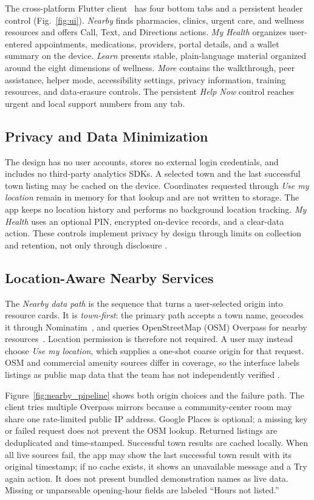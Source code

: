 \documentclass[conference,a4paper]{IEEEtran}
\begin{document}
The cross-platform Flutter client~\cite{FlutterDocs2026} has four bottom tabs
and a persistent header control (Fig.~\ref{fig:ui}). \emph{Nearby} finds
pharmacies, clinics, urgent care, and wellness resources and offers Call, Text,
and Directions actions. \emph{My Health} organizes user-entered appointments,
medications, providers, portal details, and a wallet summary on the device.
\emph{Learn} presents stable, plain-language material organized around the eight
dimensions of wellness. \emph{More} contains the walkthrough, peer assistance,
helper mode, accessibility settings, privacy information, training resources,
and data-erasure controls. The persistent \emph{Help Now} control reaches urgent
and local support numbers from any tab.

\subsection{Privacy and Data Minimization}
The design has no user accounts, stores no external login credentials, and
includes no third-party analytics SDKs. A selected town and the last successful
town listing may be cached on the device. Coordinates requested through
\emph{Use my location} remain in memory for that lookup and are not written to
storage. The app keeps no location history and performs no background location
tracking. \emph{My Health} uses an optional PIN, encrypted on-device records,
and a clear-data action. These controls implement privacy by design through
limits on collection and retention, not only through disclosure
\cite{Cavoukian2010PbDWorkshop}.

\subsection{Location-Aware Nearby Services}
The \emph{Nearby data path} is the sequence that turns a user-selected origin
into resource cards. It is \emph{town-first}: the primary path accepts a town
name, geocodes it through Nominatim~\cite{NominatimDocs}, and queries
OpenStreetMap (OSM) Overpass for nearby resources~\cite{OverpassDocs}. Location
permission is therefore not required. A user may instead choose \emph{Use my
location}, which supplies a one-shot coarse origin for that request. OSM and
commercial amenity sources differ in coverage, so the interface labels listings
as public map data that the team has not independently verified
\cite{Haklay2010OSM,Mara2025OSMGoogleAmenities}.

Figure~\ref{fig:nearby_pipeline} shows both origin choices and the failure path.
The client tries multiple Overpass mirrors because a community-center room may
share one rate-limited public IP address. Google Places is optional; a missing
key or failed request does not prevent the OSM lookup. Returned listings are
deduplicated and time-stamped. Successful town results are cached locally. When
all live sources fail, the app may show the last successful town result with its
original timestamp; if no cache exists, it shows an unavailable message and a
Try again action. It does not present bundled demonstration names as live data.
Missing or unparseable opening-hour fields are labeled ``Hours not listed.''
\end{document}
